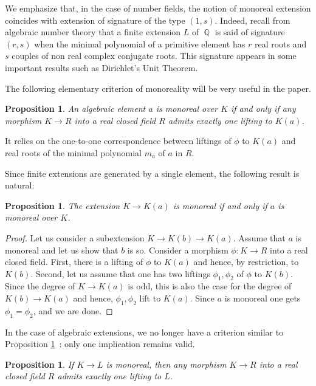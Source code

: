 \documentclass[12pt]{amsart}
\newtheorem{prop}[thm]{Proposition}
\theoremstyle{definition}
\DeclareMathOperator{\QQ}{\mathbb Q}
\begin{document}
We emphasize that, in the case of number fields, the notion of monoreal extension coincides with extension of signature of the type $(1,s)$. Indeed, recall from algebraic number theory that a finite extension $L$ of $\QQ$ is said of signature $(r,s)$ when the minimal polynomial of a primitive element has $r$ real roots and $s$ couples of non real complex conjugate roots. This signature appears in some important results such as Dirichlet's Unit Theorem.

The following elementary criterion of monoreality will be very useful in the paper.

\begin{prop}\label{CriterionFiniteMono}
An algebraic element $a$ is monoreal over $K$ if and only if any morphism $K\to R$ into a real closed field $R$ admits exactly one lifting to $K(a)$. 
\end{prop}	

It relies on the one-to-one correspondence between  liftings of $\phi$ to $K(a)$ and  real roots of  the minimal polynomial $m_a$ of $a$ in $R$.



Since finite extensions are generated by a single element, the following result is natural:

\begin{prop}\label{MonorealCriterion}
The extension $K\to K(a)$ is monoreal if and only if $a$ is monoreal over $K$.
\end{prop}

\begin{proof}
Let us consider a subextension	$K\to K(b) \to K(a)$. Assume that $a$ is monoreal and let us show that $b$ is so.
Consider a morphism $\phi: K\to R$ into a real closed field.
First, there is a lifting of $\phi$ to $K(a)$ and hence, by restriction, to $K(b)$.
Second, let us assume that one has two liftings $\phi_1,\phi_2$ of $\phi$ to $K(b)$. Since the degree of $K\to K(a)$ is odd, this is also the case for the degree of $K(b)\to K(a)$ and hence, $\phi_1,\phi_2$ lift to $K(a)$. Since $a$ is monoreal one gets $\phi_1=\phi_2$, and we are done.
\end{proof}

In the case of algebraic extensions, we no longer have a criterion similar to Proposition \ref{CriterionFiniteMono}~: only one implication remains valid. 
\begin{prop}\label{LiftingAlgebraic}
	If $K\to L$ is monoreal, then any morphism $K\to R$ into a real closed field $R$ admits exactly one lifting to $L$. 
\end{prop}
\end{document}
